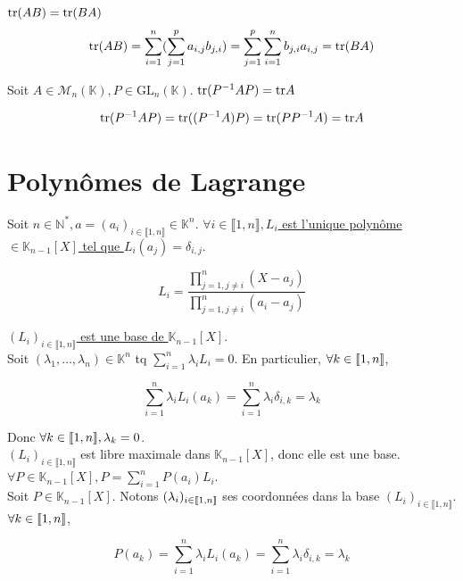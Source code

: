 \documentclass[]{article}
\begin{document}
\underline{$\text{tr} (AB) = \text{tr} (BA)$} \\

\[ \text{tr} (AB) = \sum_{i = 1}^{n} (\sum_{j = 1}^{p} a_{i, j} b_{j, i}) = \sum_{j = 1}^{p} \sum_{i = 1}^{n} b_{j, i} a_{i, j} = \text{tr}(BA) \]

Soit $A \in \mathcal{M}_n(\mathbb{K}), P \in \text{GL}_n(\mathbb{K})$. \underline{$\text{tr}(P^{-1}AP) = \text{tr} A$}

\[ \text{tr}(P^{-1}AP) = \text{tr}((P^{-1}A)P) = \text{tr}(PP^{-1}A) = \text{tr} A \]

\section{Polynômes de Lagrange}

Soit $n \in \mathbb{N}^*, a = (a_i)_{i \in \llbracket 1, n \rrbracket} \in \mathbb{K}^n$. \underline{$\forall i \in \llbracket 1, n \rrbracket, L_i$ est l'unique polynôme $\in \mathbb{K}_{n-1}[X]$ tel que $L_i(a_j) = \delta_{i, j}$}.

\[ L_i = \frac{\prod_{j=1, j\neq i}^{n} (X-a_j)}{\prod_{j=1, j\neq i}^{n} (a_i-a_j)} \]

\underline{$(L_i)_{i \in \llbracket 1, n \rrbracket}$ est une base de $\mathbb{K}_{n-1}[X]$}.\\

Soit $(\lambda_1, \dots , \lambda_n) \in \mathbb{K}^n$ tq $\sum_{i=1}^n \lambda_i L_i = 0$. En particulier, $\forall k \in \llbracket {1}, {n} \rrbracket$, 

\[ \sum_{i=1}^{n}\lambda_i L_i(a_k) = \sum_{i=1}^{n}\lambda_i \delta_{i, k} = \lambda_k \]

Donc $\forall k \in \llbracket {1}, {n} \rrbracket, \lambda_k = 0$. \\

$(L_i)_{i \in \llbracket 1, n \rrbracket}$ est libre maximale dans $\mathbb{K}_{n-1}[X]$, donc elle est une base. \\

\underline{$\forall P \in \mathbb{K}_{n-1}[X], P = \sum_{i = 1}^{n} P(a_i)L_i$}. \\

Soit $P \in \mathbb{K}_{n-1}[X]$. Notons $(\lambda_i)_{i \in \llbracket {1}, {n} \rrbracket}$ ses coordonnées dans la base $(L_i)_{i \in \llbracket 1, n \rrbracket}$. \\

$\forall k \in \llbracket {1}, {n} \rrbracket$,

\[ P(a_k) = \sum_{i=1}^{n} \lambda_i L_i(a_k) = \sum_{i=1}^{n} \lambda_i \delta_{i, k} = \lambda_k \]
\end{document}

